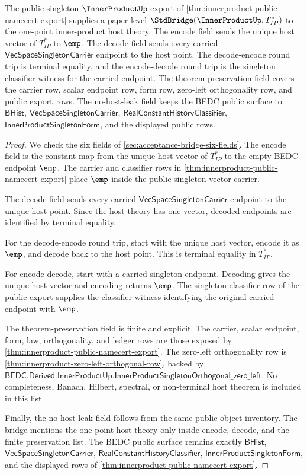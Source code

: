 \begin{theorem}
\label{thm:innerproduct-singleton-terminal-standard-bridge}
The public singleton $\InnerProductUp$ export of
\autoref{thm:innerproduct-public-namecert-export} supplies a paper-level
$\StdBridge(\InnerProductUp,T_{IP}^\ast)$ to the one-point inner-product host
theory. The encode field sends the unique host vector of $T_{IP}^\ast$ to
$\emp$. The decode field sends every carried
$\mathsf{VecSpaceSingletonCarrier}$ endpoint to the host point. The
decode-encode round trip is terminal equality, and the encode-decode round
trip is the singleton classifier witness for the carried endpoint. The
theorem-preservation field covers the carrier row, scalar endpoint row, form
row, zero-left orthogonality row, and public export rows. The no-host-leak
field keeps the BEDC public surface to $\mathsf{BHist}$,
$\mathsf{VecSpaceSingletonCarrier}$,
$\mathsf{RealConstantHistoryClassifier}$,
$\mathsf{InnerProductSingletonForm}$, and the displayed public rows.
\end{theorem}
\begin{proof}
We check the six fields of \autoref{sec:acceptance-bridge-six-fields}. The
encode field is the constant map from the unique host vector of
$T_{IP}^\ast$ to the empty BEDC endpoint $\emp$. The carrier and classifier
rows in \autoref{thm:innerproduct-public-namecert-export} place $\emp$ inside
the public singleton vector carrier.

The decode field sends every carried
$\mathsf{VecSpaceSingletonCarrier}$ endpoint to the unique host point. Since
the host theory has one vector, decoded endpoints are identified by terminal
equality.

For the decode-encode round trip, start with the unique host vector, encode it
as $\emp$, and decode back to the host point. This is terminal equality in
$T_{IP}^\ast$.

For encode-decode, start with a carried singleton endpoint. Decoding gives the
unique host vector and encoding returns $\emp$. The singleton classifier row
of the public export supplies the classifier witness identifying the original
carried endpoint with $\emp$.

The theorem-preservation field is finite and explicit. The carrier, scalar
endpoint, form, law, orthogonality, and ledger rows are those exposed by
\autoref{thm:innerproduct-public-namecert-export}. The zero-left
orthogonality row is \autoref{thm:innerproduct-zero-left-orthogonal-row},
backed by
$\mathsf{BEDC.Derived.InnerProductUp.InnerProductSingletonOrthogonal\_zero\_left}$.
No completeness, Banach, Hilbert, spectral, or non-terminal host theorem is
included in this list.

Finally, the no-host-leak field follows from the same public-object inventory.
The bridge mentions the one-point host theory only inside encode, decode, and
the finite preservation list. The BEDC public surface remains exactly
$\mathsf{BHist}$, $\mathsf{VecSpaceSingletonCarrier}$,
$\mathsf{RealConstantHistoryClassifier}$,
$\mathsf{InnerProductSingletonForm}$, and the displayed rows of
\autoref{thm:innerproduct-public-namecert-export}.
\end{proof}
